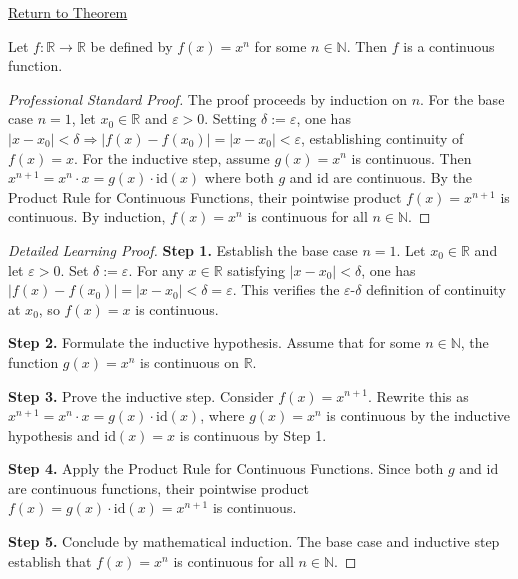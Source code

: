 \newpage
{}
\label{prf:power-function-continuous}

\begin{remark*}[Return]
\hyperref[lem:power-function-continuous]{Return to Theorem}
\end{remark*}

\begin{theorem*}
Let $f : \mathbb{R} \to \mathbb{R}$ be defined by $f(x) = x^n$ for some $n \in \mathbb{N}$. Then $f$ is a continuous function.
\end{theorem*}

\begin{proof}[Professional Standard Proof]
\LRAProofBodyStart
The proof proceeds by induction on $n$. For the base case $n = 1$, let $x_0 \in \mathbb{R}$ and $\varepsilon > 0$. Setting $\delta := \varepsilon$, one has $|x - x_0| < \delta \Rightarrow |f(x) - f(x_0)| = |x - x_0| < \varepsilon$, establishing continuity of $f(x) = x$. For the inductive step, assume $g(x) = x^n$ is continuous. Then $x^{n+1} = x^n \cdot x = g(x) \cdot \mathrm{id}(x)$ where both $g$ and $\mathrm{id}$ are continuous. By the Product Rule for Continuous Functions, their pointwise product $f(x) = x^{n+1}$ is continuous. By induction, $f(x) = x^n$ is continuous for all $n \in \mathbb{N}$.
\end{proof}

\begin{proof}[Detailed Learning Proof]
\LRAProofBodyStart

\textbf{Step 1.} Establish the base case $n = 1$. Let $x_0 \in \mathbb{R}$ and let $\varepsilon > 0$. Set $\delta := \varepsilon$. For any $x \in \mathbb{R}$ satisfying $|x - x_0| < \delta$, one has $|f(x) - f(x_0)| = |x - x_0| < \delta = \varepsilon$. This verifies the $\varepsilon$-$\delta$ definition of continuity at $x_0$, so $f(x) = x$ is continuous.

\textbf{Step 2.} Formulate the inductive hypothesis. Assume that for some $n \in \mathbb{N}$, the function $g(x) = x^n$ is continuous on $\mathbb{R}$.

\textbf{Step 3.} Prove the inductive step. Consider $f(x) = x^{n+1}$. Rewrite this as $x^{n+1} = x^n \cdot x = g(x) \cdot \mathrm{id}(x)$, where $g(x) = x^n$ is continuous by the inductive hypothesis and $\mathrm{id}(x) = x$ is continuous by Step 1.

\textbf{Step 4.} Apply the Product Rule for Continuous Functions. Since both $g$ and $\mathrm{id}$ are continuous functions, their pointwise product $f(x) = g(x) \cdot \mathrm{id}(x) = x^{n+1}$ is continuous.

\textbf{Step 5.} Conclude by mathematical induction. The base case and inductive step establish that $f(x) = x^n$ is continuous for all $n \in \mathbb{N}$.
\end{proof}

